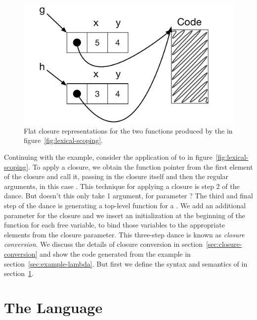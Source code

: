 \documentclass[7x10]{TimesAPriori_MIT}%
\numberwithin{theorem}{chapter}
\numberwithin{definition}{chapter}
\numberwithin{equation}{chapter}
\begin{document}
\begin{figure}[tbp]
  \centering
  \begin{minipage}{0.65\textwidth}
  \begin{tcolorbox}[colback=white]
    \includegraphics[width=\textwidth]{figs/closures}
  \end{tcolorbox}
  \end{minipage}
\caption{Flat closure representations for the two functions
  produced by the  in figure~\ref{fig:lexical-scoping}.}
\label{fig:closures}
\end{figure}

Continuing with the example, consider the application of  to
 in figure~\ref{fig:lexical-scoping}.  To apply a closure, we
obtain the function pointer from the first element of the closure and
call it, passing in the closure itself and then the regular arguments,
in this case . This technique for applying a closure is step
2 of the dance.
%
But doesn't this  only take 1 argument, for parameter
? The third and final step of the dance is generating a
top-level function for a .  We add an additional
parameter for the closure and we insert an initialization at the beginning
of the function for each free variable, to bind those variables to the
appropriate elements from the closure parameter.
%
This three-step dance is known as \emph{closure conversion}.  We
discuss the details of closure conversion in
section~\ref{sec:closure-conversion} and show the code generated from
the example in section~\ref{sec:example-lambda}. But first we define
the syntax and semantics of \LangLam{} in section~\ref{sec:r5}.

\section{The \LangLam{} Language}
\label{sec:r5}
\end{document}
